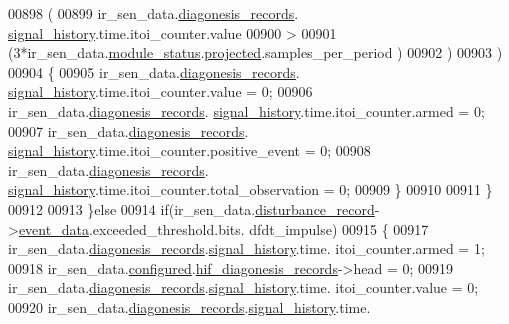 \begin{DoxyCode}
00898                        (
00899                             ir\_sen\_data.\hyperlink{a00023_a7ae905b560513ad201e58c2f63375030}{diagonesis\_records}.
      \hyperlink{a00017_affb63906d23cb1cb7787d61eaaedfb60}{signal\_history}.time.itoi\_counter.value
00900                             >
00901                             (3*ir\_sen\_data.\hyperlink{a00023_a5a53c391562b059eb744ac679f3765ca}{module\_status}.\hyperlink{a00017_a6b2516d74583418cec324c50041421c9}{projected}.samples\_per\_period
      )
00902                        )
00903                        )
00904                       \{
00905                        ir\_sen\_data.\hyperlink{a00023_a7ae905b560513ad201e58c2f63375030}{diagonesis\_records}.
      \hyperlink{a00017_affb63906d23cb1cb7787d61eaaedfb60}{signal\_history}.time.itoi\_counter.value = 0;
00906                        ir\_sen\_data.\hyperlink{a00023_a7ae905b560513ad201e58c2f63375030}{diagonesis\_records}.
      \hyperlink{a00017_affb63906d23cb1cb7787d61eaaedfb60}{signal\_history}.time.itoi\_counter.armed = 0;
00907                        ir\_sen\_data.\hyperlink{a00023_a7ae905b560513ad201e58c2f63375030}{diagonesis\_records}.
      \hyperlink{a00017_affb63906d23cb1cb7787d61eaaedfb60}{signal\_history}.time.itoi\_counter.positive\_event = 0;
00908                        ir\_sen\_data.\hyperlink{a00023_a7ae905b560513ad201e58c2f63375030}{diagonesis\_records}.
      \hyperlink{a00017_affb63906d23cb1cb7787d61eaaedfb60}{signal\_history}.time.itoi\_counter.total\_observation = 0;
00909                      \}
00910 
00911                  \}
00912 
00913          \}\textcolor{keywordflow}{else}
00914          \textcolor{keywordflow}{if}(ir\_sen\_data.\hyperlink{a00023_ac9b38e2c1d3f1013a88d33506c754152}{disturbance\_record}->\hyperlink{a00028_a8c0bda69e71ef674e60da47ad0be9ab0}{event\_data}.exceeded\_threshold.bits.
      dfdt\_impulse)
00915          \{
00917                  ir\_sen\_data.\hyperlink{a00023_a7ae905b560513ad201e58c2f63375030}{diagonesis\_records}.\hyperlink{a00017_affb63906d23cb1cb7787d61eaaedfb60}{signal\_history}.time.
      itoi\_counter.armed              = 1;
00918                  ir\_sen\_data.\hyperlink{a00023_a94b2d1f6ea4ab334c74d24984dd27843}{configured}.\hyperlink{a00021_ae18294f7499d9fcb5ec796a1816b8cd8}{hif\_diagonesis\_records}->head       
                               = 0;
00919                  ir\_sen\_data.\hyperlink{a00023_a7ae905b560513ad201e58c2f63375030}{diagonesis\_records}.\hyperlink{a00017_affb63906d23cb1cb7787d61eaaedfb60}{signal\_history}.time.
      itoi\_counter.value              = 0;
00920                  ir\_sen\_data.\hyperlink{a00023_a7ae905b560513ad201e58c2f63375030}{diagonesis\_records}.\hyperlink{a00017_affb63906d23cb1cb7787d61eaaedfb60}{signal\_history}.time.

\end{DoxyCode}

